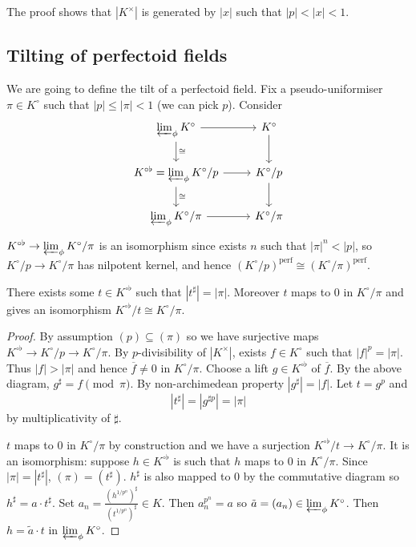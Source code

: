 \documentclass[a4paper]{article}
\newcommand{\tilt}{\flat} %
\newcommand{\perf}{\mathrm{perf}}
\begin{document}
\begin{remark}
  The proof shows that \(|K^\times|\) is generated by \(|x|\) such that \(|p| < |x| < 1\).
\end{remark}

\subsection{Tilting of perfectoid fields}

We are going to define the tilt of a perfectoid field. Fix a pseudo-uniformiser \(\pi \in K^\circ\) such that \(|p| \leq |\pi| < 1\) (we can pick \(p\)). Consider
\[
  \begin{tikzcd}
    \varprojlim_\phi K^{\circ} \ar[r] \ar[d, "\cong"] & K^\circ \ar[d] \\
    K^{\circ \tilt} = \varprojlim_\phi K^\circ/p \ar[r] \ar[d, "\cong"] & K^\circ/p \ar[d] \\
    \varprojlim_\phi K^\circ/\pi \ar[r] & K^\circ/\pi
  \end{tikzcd}
\]
\(K^{\circ \tilt} \to \varprojlim_\phi K^\circ/\pi\) is an isomorphism since exists \(n\) such that \(|\pi|^n < |p|\), so \(K^\circ/p \to K^\circ/\pi\) has nilpotent kernel, and hence \((K^\circ/p)^\perf \cong (K^\circ/\pi)^\perf\).

\begin{lemma}
  There exists some \(t \in K^{\circ \tilt}\) such that \(|t^\sharp| = |\pi|\). Moreover \(t\) maps to \(0\) in \(K^\circ/\pi\) and gives an isomorphism \(K^{\circ \tilt}/t \cong K^\circ/\pi\).
\end{lemma}

\begin{proof}
  By assumption \((p) \subseteq (\pi)\) so we have surjective maps \(K^{\circ \tilt} \to K^\circ/p \to K^\circ/\pi\). By \(p\)-divisibility of \(|K^\times|\), exists \(f \in K^\circ\) such that \(|f|^p = |\pi|\). Thus \(|f| > |\pi|\) and hence \(\overline f \ne 0\) in \(K^\circ/\pi\). Choose a lift \(g \in K^{\circ \tilt}\) of \(\overline f\). By the above diagram, \(g^\sharp = f \pmod \pi\). By non-archimedean property \(|g^\sharp| = |f|\). Let \(t = g^p\) and
  \[
    |t^\sharp| = |g^{\sharp p}| = |\pi|
  \]
  by multiplicativity of \(\sharp\).

  \(t\) maps to \(0\) in \(K^\circ/\pi\) by construction and we have a surjection \(K^{\circ \tilt}/t \to K^\circ/\pi\). It is an isomorphism: suppose \(h \in K^{\circ \tilt}\) is such that \(h\) maps to \(0\) in \(K^\circ/\pi\). Since \(|\pi| = |t^\sharp|\), \((\pi) = (t^\sharp)\). \(h^\sharp\) is also mapped to \(0\) by the commutative diagram so \(h^\sharp = a \cdot t^\sharp\). Set \(a_n = \frac{(h^{1/p^n})^\sharp}{(t^{1/p^n})^\sharp} \in K\). Then \(a_n^{p^n} = a\) so \(\tilde a = (a_n) \in \varprojlim_\phi K^\circ\). Then \(h = \tilde a \cdot t\) in \(\varprojlim_\phi K^\circ\).
\end{proof}
\end{document}
